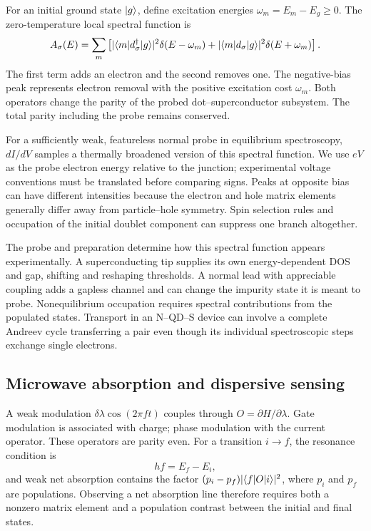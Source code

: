 For an initial ground state $\lvert g\rangle$, define excitation energies
$\omega_m=E_m-E_g\ge0$. The zero-temperature local spectral function is
\begin{equation}\label{eq:primer-spectral}
 A_\sigma(E)=\sum_m\left[
 |\langle m\vert d_\sigma^\dagger\vert g\rangle|^2\delta(E-\omega_m)
 +|\langle m\vert d_\sigma\vert g\rangle|^2\delta(E+\omega_m)\right].
\end{equation}
The first term adds an electron and the second removes one. The negative-bias
peak represents electron removal with the positive excitation cost $\omega_m$.
Both operators change the parity of the probed dot--superconductor subsystem.
The total parity including the probe remains conserved.

For a sufficiently weak, featureless normal probe in equilibrium spectroscopy,
$dI/dV$ samples a thermally broadened version of this spectral function. We use
$eV$ as the probe electron energy relative to the junction; experimental voltage
conventions must be translated before comparing signs. Peaks at opposite bias
can have different intensities because the electron and hole matrix elements
generally differ away from particle--hole symmetry.
Spin selection rules and occupation of the initial doublet component can suppress
one branch altogether.

The probe and preparation determine how this spectral function appears experimentally. A superconducting tip supplies
its own energy-dependent DOS and gap, shifting and reshaping thresholds. A normal
lead with appreciable coupling adds a gapless channel and can change the impurity
state it is meant to probe. Nonequilibrium occupation requires spectral contributions
from the populated states. Transport in an N--QD--S device can involve a complete
Andreev cycle transferring a pair even though its individual spectroscopic
steps exchange single electrons.

\subsection{Microwave absorption and dispersive sensing}

A weak modulation $\delta\lambda\cos(2\pi ft)$ couples through
$O=\partial H/\partial\lambda$. Gate modulation is associated with charge;
phase modulation with the current operator. These operators are parity even.
For a transition $i\to f$, the resonance condition is
\begin{equation}
 hf=E_f-E_i,
\end{equation}
and weak net absorption contains the factor
$(p_i-p_f)|\langle f\vert O\vert i\rangle|^2$, where $p_i$ and $p_f$ are populations. Observing a net
absorption line therefore requires both a nonzero matrix element and a population
contrast between the initial and final states.

